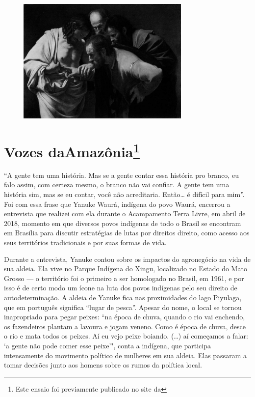 \begin{figure}[!ht]
\centering
 \includegraphics[width=85mm]{./imgs/crer.png}
\caption{\tiny{}}
\end{figure}

\chapter*{Vozes da\vspace*{-.15cm}\break Amazônia\footnote{Este ensaio foi %
  previamente publicado no site da {}}}

\noindent{}``A gente tem uma história. Mas se a gente contar essa história pro
branco, eu falo assim, com certeza mesmo, o branco não vai confiar. A
gente tem uma história sim, mas se eu contar, você não acreditaria.
Então\ldots{} é difícil para mim''. Foi com essa frase que Yanuke Waurá,
indígena do povo Waurá, encerrou a entrevista que realizei com ela
durante o Acampamento Terra Livre, em abril de 2018, momento em que
diversos povos indígenas de todo o Brasil se encontram em Brasília para
discutir estratégias de lutas por direitos direito, como acesso aos seus
territórios tradicionais e por suas formas de vida.

Durante a entrevista, Yanuke contou sobre os impactos do agronegócio na
vida de sua aldeia. Ela vive no Parque Indígena do Xingu, localizado
no Estado do Mato Grosso --- o território foi o primeiro a ser homologado
no Brasil, em 1961, e por isso é de certo modo um ícone na luta dos
povos indígenas pelo seu direito de autodeterminação. A aldeia de Yanuke
fica nas proximidades do lago Piyulaga, que em português significa
``lugar de pesca''. Apesar do nome, o local se tornou inapropriado para
pegar peixes: ``na época de chuva, quando o rio vai enchendo, os
fazendeiros plantam a lavoura e jogam veneno. Como é época de chuva,
desce o rio e mata todos os peixes. Aí eu vejo peixe boiando. (\ldots{}) aí
começamos a falar: `a gente não pode comer esse peixe'", conta a
indígena, que participa intensamente do movimento político de mulheres
em sua aldeia. Elas passaram a tomar decisões junto aos homens sobre os
rumos da política local.

